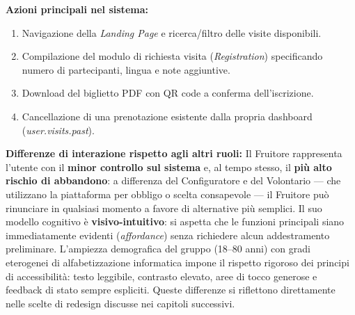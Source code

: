\textbf{Azioni principali nel sistema:}
\begin{enumerate}
    \item Navigazione della \textit{Landing Page} e ricerca/filtro delle visite disponibili.
    \item Compilazione del modulo di richiesta visita (\textit{Registration}) specificando numero di partecipanti, lingua e note aggiuntive.
    \item Download del biglietto PDF con QR code a conferma dell'iscrizione.
    \item Cancellazione di una prenotazione esistente dalla propria dashboard (\textit{user.visits.past}).
\end{enumerate}

\textbf{Differenze di interazione rispetto agli altri ruoli:}
Il Fruitore rappresenta l'utente con il \textbf{minor controllo sul sistema} e, al tempo stesso, il \textbf{più alto rischio di abbandono}: a differenza del Configuratore e del Volontario — che utilizzano la piattaforma per obbligo o scelta consapevole — il Fruitore può rinunciare in qualsiasi momento a favore di alternative più semplici. Il suo modello cognitivo è \textbf{visivo-intuitivo}: si aspetta che le funzioni principali siano immediatamente evidenti (\textit{affordance}) senza richiedere alcun addestramento preliminare. L'ampiezza demografica del gruppo (18–80 anni) con gradi eterogenei di alfabetizzazione informatica impone il rispetto rigoroso dei principi di accessibilità: testo leggibile, contrasto elevato, aree di tocco generose e feedback di stato sempre espliciti. Queste differenze si riflettono direttamente nelle scelte di redesign discusse nei capitoli successivi.